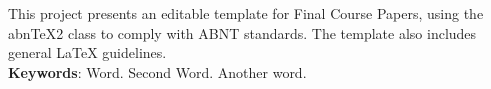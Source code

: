 
\begin{resumo}[ABSTRACT]
\begin{SingleSpacing}

This project presents an editable template for Final Course Papers, using the abn\TeX{}2 class to comply with ABNT standards. The template also includes general \LaTeX{} guidelines. \\

\textbf{Keywords}: Word. Second Word. Another word.

\end{SingleSpacing}
\end{resumo}
